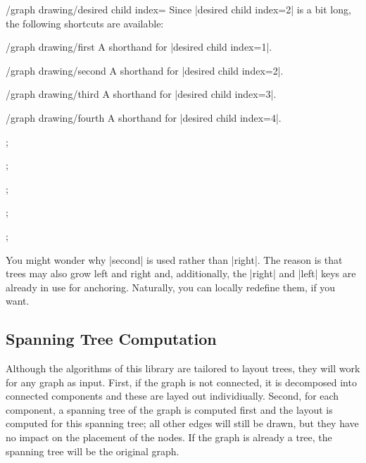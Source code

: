 \begin{key}{/graph drawing/desired child index=}
  Since |desired child index=2| is a bit long, the following shortcuts
  are available:
  \begin{key}{/graph drawing/first}
    A shorthand for |desired child index=1|.    
  \end{key}
  \begin{key}{/graph drawing/second}
    A shorthand for |desired child index=2|.    
  \end{key}
  \begin{key}{/graph drawing/third}
    A shorthand for |desired child index=3|.    
  \end{key}
  \begin{key}{/graph drawing/fourth}
    A shorthand for |desired child index=4|.    
  \end{key}
\begin{codeexample}[]
\tikz {};  
\end{codeexample}
\begin{codeexample}[]
\tikz {};  
\end{codeexample}
\begin{codeexample}[]
\tikz {};  
\end{codeexample}
\begin{codeexample}[]
\tikz {};  
\end{codeexample}
\begin{codeexample}[]
\tikz {};  
\end{codeexample}
  You might wonder why |second| is used rather than |right|. The
  reason is that trees may also grow left and right and, additionally,
  the |right| and |left| keys are already in use for
  anchoring. Naturally, you can locally redefine them, if you want.
\end{key}


\subsection{Spanning Tree Computation}
\label{subsection-gd-spanning-tree}
Although the algorithms of this library are tailored to layout trees,
they will work for any graph as input. First, if the graph is not
connected, it is decomposed into connected components and these are
layed out individiually. Second, for each component, a spanning tree of
the graph is computed first and the layout is computed for this
spanning tree; all other edges will still be drawn, but they have no
impact on the placement of the nodes. If the graph is already a tree,
the spanning tree will be the original graph.

